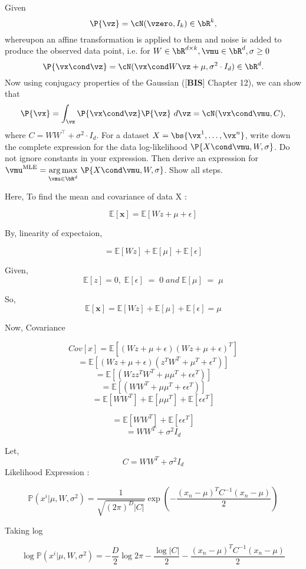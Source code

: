 \documentclass[a4paper,11pt]{article}
\begin{document}
\begin{mlsolution}

Given
\[
\P{\vz} = \cN(\vzero,I_k) \in \bR^k,
\]
whereupon an affine transformation is applied to them and noise is added to produce the observed data point, i.e. for $W \in \bR^{d\times k}, \vmu \in \bR^d, \sigma \geq 0$
\[
\P{\vx\cond\vz} = \cN(\vx\cond W\vz+\mu, \sigma^2\cdot I_d) \in \bR^d.
\]
Now using conjugacy properties of the Gaussian ([\textbf{BIS}] Chapter 12), we can show that
\[
\P{\vx} = \int_{\vz}\P{\vx\cond\vz}\P{\vz}\ d\vz = \cN(\vx\cond\vmu,C),
\]
where $C = WW^\top + \sigma^2\cdot I_d$. For a dataset $X = \bs{\vx^1,\ldots,\vx^n}$, write down the complete expression for the data log-likelihood $\P{X\cond\vmu,W,\sigma}$. Do not ignore constants in your expression. Then derive an expression for $\vmu^{\text{MLE}} = \underset{\vmu\in\bR^d}{\arg\max}\ \P{X\cond\vmu,W,\sigma}$. Show all steps. 

Here, To find the mean and covariance of data X :

\[
\mathbb{E}[\textbf{x}] = \mathbb{E}[Wz + \mu + \epsilon]
\]

By, linearity of expectaion,

\[
 =  \mathbb{E}[Wz] + \mathbb{E}[\mu] + \mathbb{E}[\epsilon] 
\]

Given,
\[
\mathbb{E}[z] = 0,\; \mathbb{E}[\epsilon]\; =\; 0 \;and \;\mathbb{E}[\mu]\; = \;\mu 
\]

So, 
\[
\mathbb{E}[\textbf{x}] =  \mathbb{E}[Wz] + \mathbb{E}[\mu] + \mathbb{E}[\epsilon] = \mu
\]

Now, Covariance 

\[
Cov[x] = \mathbb{E}[(Wz + \mu + \epsilon)(Wz + \mu + \epsilon)^T]
\]
\[
=  \mathbb{E}[(Wz + \mu + \epsilon)(z^TW^T + \mu^T + \epsilon^T)]
\]
\[
=  \mathbb{E}[(Wzz^TW^T + \mu\mu^T + \epsilon\epsilon^T)]
\]
\[
=  \mathbb{E}[(WW^T + \mu\mu^T + \epsilon\epsilon^T)]
\]
\[
=  \mathbb{E}[WW^T] + \mathbb{E}[\mu\mu^T] + \mathbb{E}[\epsilon\epsilon^T]
\]

\[
=  \mathbb{E}[WW^T] + \mathbb{E}[\epsilon\epsilon^T]
\]
\[
=  WW^T + \sigma^2I_d
\]

Let,
 \[
    C = WW^T + \sigma^2I_d
 \]
Likelihood Expression : 

\[
\mathbb{P}(x^i | \mu, W, \sigma^2) = \frac{1}{\sqrt{(2\pi)^D |C|}} \exp\left ( -\frac{(x_n - \mu)^TC^{-1}(x_n - \mu)}{2} \right )
\]

Taking log 

\[
\log\mathbb{P}(x^i | \mu, W, \sigma^2) = -\frac{D}{2}\log2\pi - \frac{\log|C|}{2}   -\frac{(x_n - \mu)^TC^{-1}(x_n - \mu)}{2}
\]


\end{mlsolution}
\end{document}
